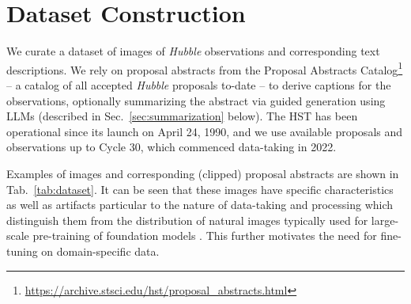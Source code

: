 \documentclass[10pt]{article} %
\newcommand{\SM}[1]{\textcolor{blue}{[SM: #1]}}
\newcommand{\hubble}{\emph{Hubble}\xspace}
\newcommand{\datafolder}[1]{\def\thedatafolder{#1}}
\begin{document}
\section{Dataset Construction}
\label{sec:dataset}

We curate a dataset of images of \hubble observations and corresponding text descriptions.
%
We rely on proposal abstracts from the Proposal Abstracts Catalog\footnote{\url{https://archive.stsci.edu/hst/proposal_abstracts.html}} -- a catalog of all accepted \hubble proposals to-date -- to derive captions for the observations, optionally summarizing the abstract via guided generation using LLMs (described in Sec.~\ref{sec:summarization} below).
%
The HST has been operational since its launch on April 24, 1990, and we use available proposals and observations up to Cycle 30, which commenced data-taking in 2022.
%


Examples of images and corresponding (clipped) proposal abstracts are shown in Tab.~\ref{tab:dataset}. %
%
It can be seen that these images have specific characteristics as well as artifacts particular to the nature of data-taking and processing which distinguish them from the distribution of natural images typically used for large-scale pre-training of foundation models \citep{deng2009imagenet}.
%
This further motivates the need for fine-tuning on domain-specific data.


\datafolder{./plots/data/}
\end{document}

